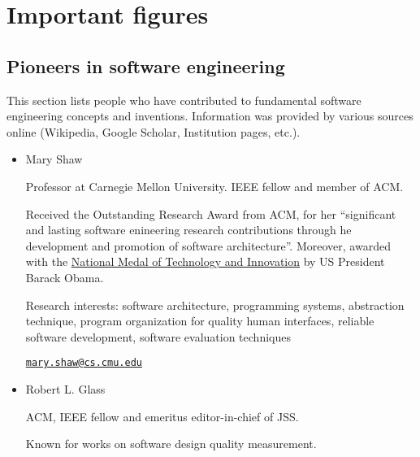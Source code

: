 \documentclass[a4paper]{article}
\begin{document}
    \newpage
    \section{Important figures}
        \subsection*{Pioneers in software engineering}

            This section lists people who have contributed to fundamental software engineering concepts and inventions.
            Information was provided by various sources online (Wikipedia, Google Scholar, Institution pages, etc.).

            \begin{itemize}
                \item 
                Mary Shaw

                Professor at Carnegie Mellon University.
                IEEE fellow and member of ACM.

                Received the Outstanding Research Award from ACM, for her ``significant and lasting software enineering research contributions through he development and promotion of software architecture''.
                Moreover, awarded with the \href{https://nationalmedals.org/laureate/mary-shaw/}{National Medal of Technology and Innovation} by US President Barack Obama.
                
                Research interests: software architecture, programming systems, abstraction technique, program organization for quality human interfaces, reliable software development, software evaluation techniques

                \href{mailto:mary.shaw@cs.cmu.edu}{\texttt{mary.shaw@cs.cmu.edu}}


                
                \item Robert L. Glass
                
                ACM, IEEE fellow and emeritus editor-in-chief of JSS.

                Known for works on software design quality measurement.


\end{itemize}
\end{document}
